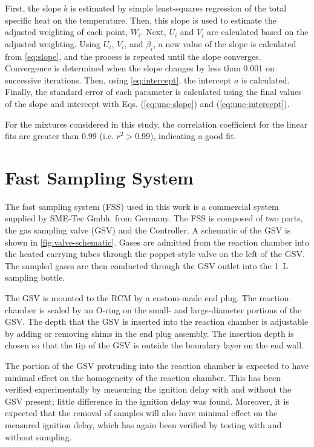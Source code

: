 \documentclass[../main.tex]{subfiles}
\begin{document}
First, the slope $b$ is estimated by simple least-squares regression of the total
specific heat on the temperature. Then, this slope is used to estimate the
adjusted weighting of each point, $W_i$. Next, $U_i$ and $V_i$ are calculated
based on the adjusted weighting. Using $U_i$, $V_i$, and $\beta_i$, a new value of the
slope is calculated from \autoref{eq:slope}, and the process is repeated until the slope converges.
Convergence is determined when the slope changes by less than 0.001 on successive
iterations. Then, using \autoref{eq:intercept}, the intercept $a$ is calculated.
Finally, the standard error of each parameter is
calculated using the final values of the slope and intercept with Eqs. (\ref{eq:unc-slope})
and (\ref{eq:unc-intercept}).

For the mixtures considered in
this study, the correlation coefficient for the linear fits are greater than
0.99 (i.e. $r^2 > 0.99$), indicating a good fit.

\section{Fast Sampling System}
\label{sec:fast-sampling}

The fast sampling system (FSS) used in this work is a commercial system supplied by
SME-Tec Gmbh. from Germany. The FSS is composed of two parts, the gas sampling valve
(GSV) and the Controller. A schematic of the GSV is shown in \autoref{fig:valve-schematic}.
Gases are admitted from the reaction chamber into the heated carrying tubes
through the poppet-style valve on the left of the GSV. The sampled gases are then
conducted through the GSV outlet into the \SI{1}{\liter} sampling bottle.

The GSV is mounted to the RCM by a custom-made end plug. The reaction chamber
is sealed by an O-ring on the small- and large-diameter portions of the GSV.
The depth that the GSV is inserted into the reaction chamber is adjustable
by adding or removing shims in the end plug assembly. The insertion depth
is chosen so that the tip of the GSV is outside the boundary layer on the
end wall.

The portion of the GSV protruding into the reaction chamber is expected
to have minimal effect on the homogeneity of the reaction chamber. This
has been verified experimentally by measuring the ignition delay with
and without the GSV present; little difference in the ignition delay was
found. Moreover, it is expected that the removal of samples will also
have minimal effect on the measured ignition delay, which has again
been verified by testing with and without sampling.
\end{document}
